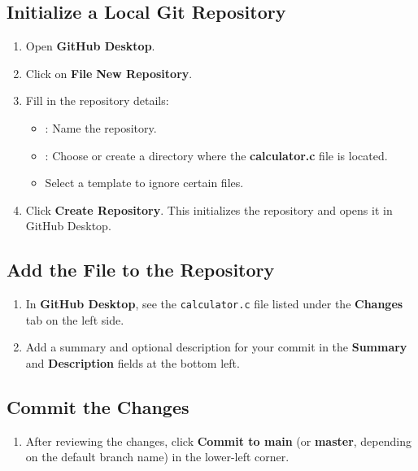 \subsection{Initialize a Local Git Repository}
\begin{enumerate}
    \item Open \textbf{GitHub Desktop}.
    \item Click on \textbf{File} \textbf{New Repository}.
    \item Fill in the repository details:
    \begin{itemize}
        \item \textbf{}: Name the repository.
        \item \textbf{}: Choose or create a directory where the \textbf{calculator.c} file is located.
        \item \textbf{} Select a template to ignore certain files.
    \end{itemize}
    \item Click \textbf{Create Repository}. This initializes the repository and opens it in GitHub Desktop.
\end{enumerate}

\subsection{Add the File to the Repository}
\begin{enumerate}
    \item In \textbf{GitHub Desktop}, see the \texttt{calculator.c} file listed under the \textbf{Changes} tab on the left side.
    \item Add a summary and optional description for your commit in the \textbf{Summary} and \textbf{Description} fields at the bottom left.
\end{enumerate}

\subsection{Commit the Changes}
\begin{enumerate}
    \item After reviewing the changes, click \textbf{Commit to main} (or \textbf{master}, depending on the default branch name) in the lower-left corner.
\end{enumerate}

